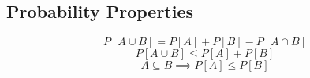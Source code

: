 \subsection{Probability Properties}
\begin{equation}
    P\left[A \cup B\right] = P\left[A\right] + P\left[B\right] - P\left[A \cap B\right]
\end{equation}
\begin{equation}
    P\left[A \cup B\right] \leq P\left[A\right] + P\left[B\right]
\end{equation}
\begin{equation}
    A \subseteq B \implies P\left[A\right] \leq P\left[B\right]
\end{equation}